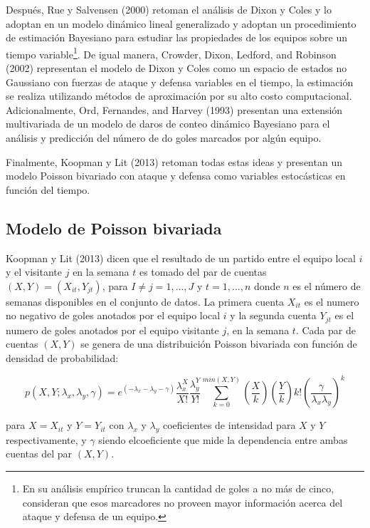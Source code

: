 Después, Rue y Salvensen (2000) \cite{rue2000prediction} retoman el análisis de Dixon y Coles \cite{dixon1997modelling} y lo adoptan en un modelo dinámico lineal generalizado y adoptan un procedimiento de estimación Bayesiano para estudiar las propiedades de los equipos sobre un tiempo variable\footnote{En su análisis empírico truncan la cantidad de goles a no más de cinco, consideran que esos marcadores no proveen mayor información acerca del ataque y defensa de un equipo.}. De igual manera, Crowder, Dixon, Ledford, and Robinson (2002) \cite{crowder2002dynamic} representan el modelo de Dixon y Coles \cite{dixon1997modelling} como un espacio de estados no Gaussiano con fuerzas de ataque y defensa variables en el tiempo, la estimación se realiza utilizando métodos de aproximación por su alto costo computacional. Adicionalmente, Ord, Fernandes, and Harvey (1993) \cite{ord1993time} presentan una extensión multivariada de un modelo de daros de conteo dinámico Bayesiano para el análisis y predicción del número de do goles marcados por algún equipo.

Finalmente, Koopman y Lit (2013) \cite{koopman2013dynamic} retoman todas estas ideas y presentan un modelo Poisson bivariado con ataque y defensa como variables estocásticas en función del tiempo. 
\subsection{Modelo de Poisson bivariada}
\label{subsec:bivariate-poisson}

Koopman y Lit (2013) \cite{koopman2013dynamic} dicen que el resultado de un partido entre el equipo local $i$ y el visitante $j$ en la semana $t$ es tomado del par de cuentas $(X,Y) = (X_{it},Y_{jt})$, para $I\neq j = 1, ...,J$ y $t=1,...,n$ donde $n$ es el número de semanas disponibles en el conjunto de datos. La primera cuenta $X_{it}$ es el numero no negativo de goles anotados por el equipo local $i$ y la segunda cuenta $Y_{jt}$ es el numero de goles anotados por el equipo visitante $j$, en la semana $t$. Cada par de cuentas $(X,Y)$ se genera de una distribuición Poisson bivariada con función de densidad de probabilidad:
 
\[p(X,Y;\lambda_x,\lambda_y,\gamma) = e^{(-\lambda_x-\lambda_y-\gamma)}\frac{\lambda^X_x}{X!}\frac{\lambda^Y_y}{Y!}\sum_{k=0}^{min(X,Y)}\left(\frac{X}{k}\right)\left(\frac{Y}{k}\right)k!\left(\frac{\gamma}{\lambda_x\lambda_y}\right)^k \]

para $X = X_{it}$ y $Y = Y_{it}$ con $\lambda_x$ y $\lambda_y$ coeficientes de intensidad para $X$ y $Y$ respectivamente, y $\gamma$ siendo elcoeficiente que mide la dependencia entre ambas cuentas del par $(X,Y)$. 

